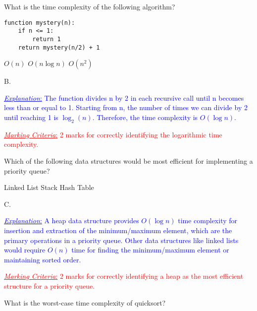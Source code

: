 \documentclass[addpoints,12pt]{exam}
\newcommand{\mycorrectchoice}[1]{\CorrectChoice \fbox{#1}}
\newcommand{\mycorrectchoice}[1]{\CorrectChoice #1}
\newcommand{\Exp}[1]{\textcolor{blue}{\underline{\emph{Explanation}:} #1}}
\newcommand{\MC}[1]{\textcolor{red}{\underline{\emph{Marking Criteria}:} #1}}
\begin{document}
\begin{questions}
\label{first_page}

\question[2] What is the time complexity of the following algorithm?

\begin{verbatim}
function mystery(n):
    if n <= 1:
        return 1
    return mystery(n/2) + 1
\end{verbatim}

\begin{choices}
  \choice $O(n)$
  \mycorrectchoice{$O(\log n)$}
  \choice $O(n \log n)$
  \choice $O(n^2)$
\end{choices}

\begin{solution}
  B.
  
  \Exp{
    The function divides n by 2 in each recursive call until n becomes less than or equal to 1.
    Starting from n, the number of times we can divide by 2 until reaching 1 is $\log_2(n)$.
    Therefore, the time complexity is $O(\log n)$.
  }
  
  \MC{
    2 marks for correctly identifying the logarithmic time complexity.
  }
\end{solution}

\vspace{20pt}

\question[2] Which of the following data structures would be most efficient for implementing a priority queue?

\begin{choices}
  \choice Linked List
  \choice Stack
  \mycorrectchoice{Heap}
  \choice Hash Table
\end{choices}

\begin{solution}
  C.
  
  \Exp{
    A heap data structure provides $O(\log n)$ time complexity for insertion and extraction of the minimum/maximum element,
    which are the primary operations in a priority queue. Other data structures like linked lists would require $O(n)$ time
    for finding the minimum/maximum element or maintaining sorted order.
  }
  
  \MC{
    2 marks for correctly identifying a heap as the most efficient structure for a priority queue.
  }
\end{solution}

\vspace{20pt}

\question[2] What is the worst-case time complexity of quicksort?


\end{questions}
\end{document}
